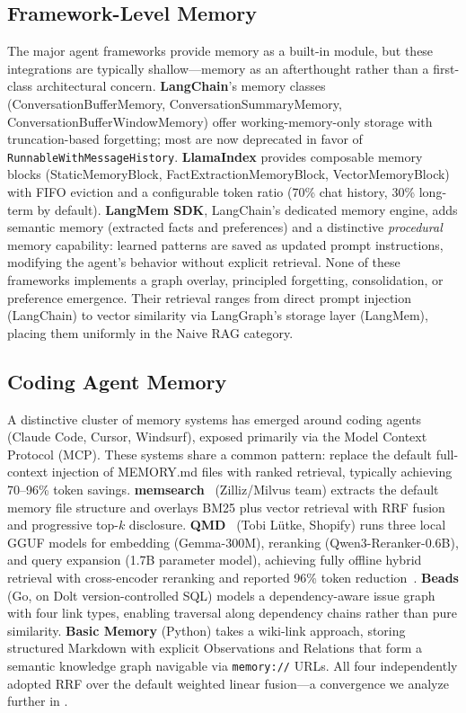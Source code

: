 \subsection{Framework-Level Memory}
\label{sec:framework}

The major agent frameworks provide memory as a built-in module, but
these integrations are typically shallow---memory as an afterthought
rather than a first-class architectural concern. \textbf{LangChain}'s
memory classes (ConversationBufferMemory, ConversationSummaryMemory,
ConversationBufferWindowMemory) offer working-memory-only storage with
truncation-based forgetting; most are now deprecated in favor of
\texttt{RunnableWithMessageHistory}. \textbf{LlamaIndex} provides
composable memory blocks (StaticMemoryBlock,
FactExtractionMemoryBlock, VectorMemoryBlock) with FIFO eviction and
a configurable token ratio (70\% chat history, 30\% long-term by
default). \textbf{LangMem SDK}, LangChain's dedicated memory engine,
adds semantic memory (extracted facts and preferences) and a
distinctive \emph{procedural} memory capability: learned patterns are
saved as updated prompt instructions, modifying the agent's behavior
without explicit retrieval. None of these frameworks implements a
graph overlay, principled forgetting, consolidation, or preference
emergence. Their retrieval ranges from direct prompt injection
(LangChain) to vector similarity via LangGraph's storage layer
(LangMem), placing them uniformly in the Naive RAG category.

\subsection{Coding Agent Memory}
\label{sec:coding-agents}

A distinctive cluster of memory systems has emerged around coding
agents (Claude Code, Cursor, Windsurf), exposed primarily via the
Model Context Protocol (MCP). These systems share a common pattern:
replace the default full-context injection of MEMORY.md files with
ranked retrieval, typically achieving 70--96\% token savings.
\textbf{memsearch}~\cite{zilliz2026a} (Zilliz/Milvus team) extracts
the default memory file structure and overlays BM25 plus vector
retrieval with RRF fusion and progressive top-$k$ disclosure.
\textbf{QMD}~\cite{lutke2026qmd} (Tobi L\"utke, Shopify) runs three
local GGUF models for embedding (Gemma-300M), reranking
(Qwen3-Reranker-0.6B), and query expansion (1.7B parameter model),
achieving fully offline hybrid retrieval with cross-encoder reranking
and reported 96\% token reduction~\cite{levine2026}. \textbf{Beads}
(Go, on Dolt version-controlled SQL) models a dependency-aware issue
graph with four link types, enabling traversal along dependency chains
rather than pure similarity. \textbf{Basic Memory} (Python) takes a
wiki-link approach, storing structured Markdown with explicit
Observations and Relations that form a semantic knowledge graph
navigable via \texttt{memory://} URLs. All four independently adopted
RRF over the default weighted linear fusion---a convergence we
analyze further in .

